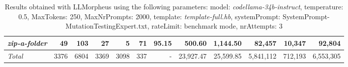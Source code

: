 \begin{table*}
{\begin{tabular}{l||r|r|r|r|r|r||r|r||r|r|r}
   \hline
   \textit{zip-a-folder} & 49 & 103 & 27 & 5 & 71 & 95.15 & 500.60 & 1,144.50 & 82,457 & 10,347 & 92,804 \\ 
   \hline
   \textit{Total} & 3376 & 6804 & 3369 & 3098 & 337 & - & 23,927.47  & 25,599.85 & 5,841,112 & 712,193 & 6,553,305 \\ 
 \end{tabular}
 }
 \caption{Results obtained with LLMorpheus using the following parameters: 
   model: \textit{codellama-34b-instruct}, 
   temperature: 0.5, 
   MaxTokens: 250, 
   MaxNrPrompts: 2000, 
   template: \textit{template-full.hb}, 
   systemPrompt: SystemPrompt-MutationTestingExpert.txt, 
   rateLimit: benchmark mode, 
   nrAttempts: 3  
 }
\end{table*}

